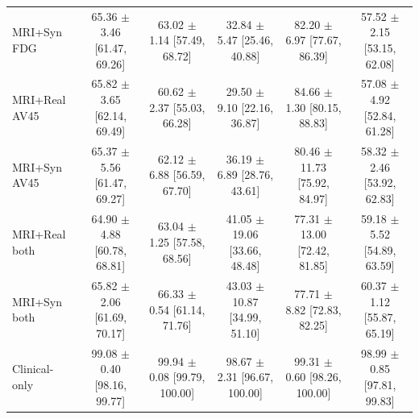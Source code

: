 \begin{landscape}
\begin{longtable}{lccccc}
MRI+Syn FDG & \shortstack{65.36 $\pm$ 3.46\\{}[61.47, 69.26]} & \shortstack{63.02 $\pm$ 1.14\\{}[57.49, 68.72]} & \shortstack{32.84 $\pm$ 5.47\\{}[25.46, 40.88]} & \shortstack{82.20 $\pm$ 6.97\\{}[77.67, 86.39]} & \shortstack{57.52 $\pm$ 2.15\\{}[53.15, 62.08]} \\
MRI+Real AV45 & \shortstack{65.82 $\pm$ 3.65\\{}[62.14, 69.49]} & \shortstack{60.62 $\pm$ 2.37\\{}[55.03, 66.28]} & \shortstack{29.50 $\pm$ 9.10\\{}[22.16, 36.87]} & \shortstack{84.66 $\pm$ 1.30\\{}[80.15, 88.83]} & \shortstack{57.08 $\pm$ 4.92\\{}[52.84, 61.28]} \\
MRI+Syn AV45 & \shortstack{65.37 $\pm$ 5.56\\{}[61.47, 69.27]} & \shortstack{62.12 $\pm$ 6.88\\{}[56.59, 67.70]} & \shortstack{36.19 $\pm$ 6.89\\{}[28.76, 43.61]} & \shortstack{80.46 $\pm$ 11.73\\{}[75.92, 84.97]} & \shortstack{58.32 $\pm$ 2.46\\{}[53.92, 62.83]} \\
MRI+Real both & \shortstack{64.90 $\pm$ 4.88\\{}[60.78, 68.81]} & \shortstack{63.04 $\pm$ 1.25\\{}[57.58, 68.56]} & \shortstack{41.05 $\pm$ 19.06\\{}[33.66, 48.48]} & \shortstack{77.31 $\pm$ 13.00\\{}[72.42, 81.85]} & \shortstack{59.18 $\pm$ 5.52\\{}[54.89, 63.59]} \\
MRI+Syn both & \shortstack{65.82 $\pm$ 2.06\\{}[61.69, 70.17]} & \shortstack{66.33 $\pm$ 0.54\\{}[61.14, 71.76]} & \shortstack{43.03 $\pm$ 10.87\\{}[34.99, 51.10]} & \shortstack{77.71 $\pm$ 8.82\\{}[72.83, 82.25]} & \shortstack{60.37 $\pm$ 1.12\\{}[55.87, 65.19]} \\
Clinical-only & \shortstack{99.08 $\pm$ 0.40\\{}[98.16, 99.77]} & \shortstack{99.94 $\pm$ 0.08\\{}[99.79, 100.00]} & \shortstack{98.67 $\pm$ 2.31\\{}[96.67, 100.00]} & \shortstack{99.31 $\pm$ 0.60\\{}[98.26, 100.00]} & \shortstack{98.99 $\pm$ 0.85\\{}[97.81, 99.83]} \\

\end{longtable}
\end{landscape}
